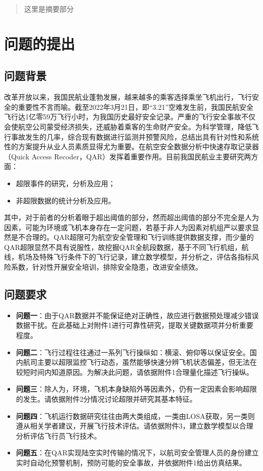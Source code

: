 \documentclass{MathorCupModeling}
\begin{document}
	\begin{abstract}
		这里是摘要部分
	\end{abstract}

	\pagestyle{empty}
	\tableofcontents
	\newpage
	\pagestyle{fancy}

	\setcounter{page}{1}
	\section{问题的提出}
	\subsection{问题背景}
	改革开放以来，我国民航业蓬勃发展，越来越多的乘客选择乘坐飞机出行，飞行安全的重要性不言而喻。截至2022年3月21日，即“3.21”空难发生前，我国民航安全飞行达1亿零59万飞行小时，为我国历史最好安全记录。严重的飞行安全事故不仅会使航空公司蒙受经济损失，还威胁着乘客的生命财产安全。为科学管理，降低飞行事故发生的几率，综合现有数据进行监测并预警风险，总结出具有针对性和系统性的方案提升从业人员素质显得尤为重要。在航空安全数据分析中快速存取记录器（Quick Access Recoder，QAR）发挥着重要作用。目前我国民航业主要研究两方面：
	\begin{itemize}
		\item 超限事件的研究，分析及应用；
		\item 非超限数据的统计分析及应用。
	\end{itemize}其中，对于前者的分析着眼于超出阈值的部分，然而超出阈值的部分不完全是人为因素，可能为环境或飞机本身存在一定问题，若基于非人为因素对机组严以要求显然是不合理的。QAR超限可为航空安全管理和飞行训练提供数据支撑，而少量的QAR超限显然不具有说服性，故挖掘QAR全航段数据，基于不同飞行机组，航线，机场及特殊飞行条件下的飞行记录，建立数学模型，并分析之，评估各指标风险系数，针对性开展安全培训，排除安全隐患，改进安全绩效。
	\subsection{问题要求}
	\begin{itemize}
		\item \textbf{问题一}：由于QAR数据并不能保证绝对正确性，故应进行数据预处理减少错误数据干扰。在此基础上对附件1进行可靠性研究，提取关键数据项并分析重要程度。
		\item \textbf{问题二}：飞行过程往往通过一系列飞行操纵如：横滚、俯仰等以保证安全。国内航司主要以超限监控飞行动态，虽然能够快速分辨飞机状态偏差，但无法在较短时间内知道原因。为解决此问题，请依据附件1合理量化描述飞行操纵。
		\item \textbf{问题三}：除人为，环境，飞机本身缺陷外等因素外，仍有一定因素会影响超限的发生。请依据附件2分情况讨论超限并研究其基本特征。
		\item \textbf{问题四}：飞机运行数据研究往往由两大类组成，一类由LOSA获取，另一类则遵从相关学者建议，开展飞行技术评估。请依据附件3，建立数学模型以合理分析评估飞行员飞行技术。
		\item \textbf{问题五}：在QAR实现陆空实时传输的情况下，以航司安全管理人员的身份建立实时自动化预警机制，预防可能的安全事故，并依据附件1给出仿真结果。
	\end{itemize}
\end{document}
